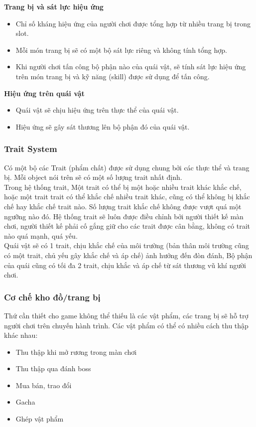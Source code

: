 \textbf{Trang bị và sát lực hiệu ứng}
\begin{itemize}
	\item Chỉ số kháng hiệu ứng của người chơi được tổng hợp từ nhiều trang bị trong slot.
	\item Mỗi món trang bị sẽ có một bộ sát lực riêng và không tính tổng hợp.
	\item Khi người chơi tấn công bộ phận nào của quái vật, sẽ tính sát lực hiệu ứng trên món trang bị và kỹ năng (skill) được sử dụng để tấn công.
\end{itemize}

\textbf{Hiệu ứng trên quái vật}
\begin{itemize}
	\item Quái vật sẽ chịu hiệu ứng trên thực thể của quái vật.
	\item Hiệu ứng sẽ gây sát thương lên bộ phận đó của quái vật.
\end{itemize}

\subsubsection{Trait System}
\hspace*{1cm} Có một bộ các Trait (phẩm chất) được sử dụng chung bởi các thực thể và trang bị. Mỗi object nói trên sẽ có một số lượng trait nhất định.\\
\hspace*{1cm} Trong hệ thống trait, Một trait có thể bị một hoặc nhiều trait khác khắc chế, hoặc một trait trait có thể khắc chế nhiều trait khác, cũng có thể không bị khắc chế hay khắc chế trait nào. Số lượng trait khắc chế không được vượt quá một ngưỡng nào đó. Hệ thống trait sẽ luôn được điều chỉnh bởi người thiết kế màn chơi, người thiết kế phải cố gắng giữ cho các trait được cân bằng, không có trait nào quá mạnh, quá yếu.\\ 
\hspace*{1cm} Quái vật sẽ có 1 trait, chịu khắc chế của môi trường (bản thân môi trường cũng có một trait, chủ yếu gây khắc chế và áp chế) ảnh hưởng đến đòn đánh, Bộ phận của quái cũng có tối đa 2 trait, chịu khắc và áp chế từ sát thương vũ khí người chơi.
\subsubsection{Cơ chế kho đồ/trang bị}
Thứ cần thiết cho game không thể thiếu là các vật phẩm, các trang bị sẽ hỗ trợ người chơi trên chuyến hành trình. Các vật phẩm có thể có nhiều cách thu thập khác nhau:
\begin{itemize}
	\item Thu thập khi mở rương trong màn chơi
	\item Thu thập qua đánh boss
	\item Mua bán, trao đổi
	\item Gacha
	\item Ghép vật phẩm
\end{itemize}

